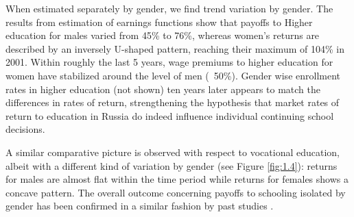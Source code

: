 \documentclass[12pt,a4paper]{article}
\numberwithin{equation}{section}
\begin{document}
When estimated separately by gender, we find trend variation by gender. The results from estimation of earnings functions show that payoffs to Higher education for males varied from 45\% to 76\%, whereas women's returns are described by an inversely U-shaped pattern, reaching their maximum of 104\% in 2001. Within roughly the last 5 years, wage premiums to higher education for women have stabilized around the level of men (~50\%).  Gender wise enrollment rates in higher education (not shown) ten years later appears to match the differences in rates of return, strengthening the hypothesis that market rates of return to education in Russia do indeed influence individual continuing school decisions. 

A similar comparative picture is observed with respect to vocational education, albeit with a different kind of variation by gender (see Figure \ref{fig:1.4}): returns for males are almost flat within the time period while returns for females shows a concave pattern. The overall outcome concerning payoffs to schooling isolated by gender has been confirmed in a similar fashion by past studies \parencite[e.g.,][]{cheidvasser_006._2007}.
\end{document}
